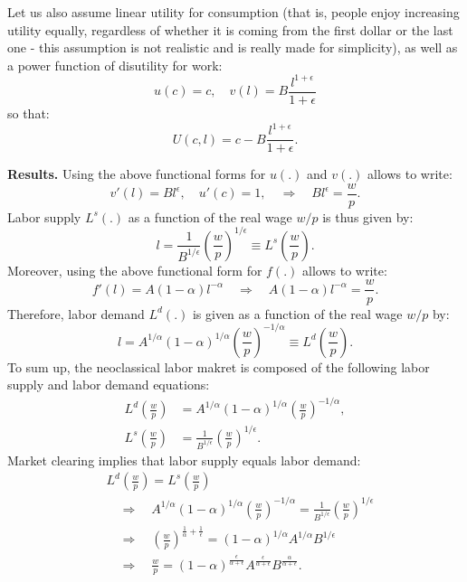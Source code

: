 \documentclass[]{book}
\theoremstyle{definition}
\theoremstyle{definition}
\theoremstyle{definition}
\theoremstyle{remark}
\begin{document}
Let us also assume linear utility for consumption (that is, people enjoy
increasing utility equally, regardless of whether it is coming from the
first dollar or the last one - this assumption is not realistic and is
really made for simplicity), as well as a power function of disutility
for work: \[u(c)=c, \quad v(l)=B\frac{l^{1+\epsilon}}{1+\epsilon}\] so
that: \[U(c, l)=c-B\frac{l^{1+\epsilon}}{1+\epsilon}.\]

\textbf{Results.} Using the above functional forms for \(u(.)\) and
\(v(.)\) allows to write:
\[v'(l)=Bl^{\epsilon}, \quad u'(c)=1, \quad \Rightarrow \quad Bl^{\epsilon} = \frac{w}{p}.\]
Labor supply \(L^{s}(.)\) as a function of the real wage \(w/p\) is thus
given by:
\[l =\frac{1}{B^{1/\epsilon}} \left(\frac{w}{p}\right)^{1/\epsilon} \equiv L^s\left(\frac{w}{p}\right).\]
Moreover, using the above functional form for \(f(.)\) allows to write:
\[f'(l) =A(1-\alpha)l^{-\alpha} \quad \Rightarrow \quad A(1-\alpha)l^{-\alpha}=\frac{w}{p}.\]
Therefore, labor demand \(L^d(.)\) is given as a function of the real
wage \(w/p\) by:
\[l=A^{1/\alpha}(1-\alpha)^{1/\alpha}\left(\frac{w}{p}\right)^{-1/\alpha}\equiv L^d\left(\frac{w}{p}\right).\]
To sum up, the neoclassical labor makret is composed of the following
labor supply and labor demand equations: \[
\begin{aligned}
L^d\left(\frac{w}{p}\right) &= A^{1/\alpha}(1-\alpha)^{1/\alpha}\left(\frac{w}{p}\right)^{-1/\alpha},\\
L^s\left(\frac{w}{p}\right) &= \frac{1}{B^{1/\epsilon}} \left(\frac{w}{p}\right)^{1/\epsilon}.
\end{aligned}
\] Market clearing implies that labor supply equals labor demand: \[
\begin{aligned}
&L^d\left(\frac{w}{p}\right) = L^s\left(\frac{w}{p}\right) \\
&\quad \Rightarrow \quad A^{1/\alpha}(1-\alpha)^{1/\alpha}\left(\frac{w}{p}\right)^{-1/\alpha} = \frac{1}{B^{1/\epsilon}} \left(\frac{w}{p}\right)^{1/\epsilon} \\
&\quad \Rightarrow \quad \left(\frac{w}{p}\right)^{\frac{1}{\alpha} +\frac{1}{\epsilon}}= (1-\alpha)^{1/\alpha}A^{1/\alpha} B^{1/\epsilon}\\
& \quad \Rightarrow \quad \frac{w}{p} = (1-\alpha)^{\frac{\epsilon}{\alpha+\epsilon}}A^{\frac{\epsilon}{\alpha+\epsilon}} B^{\frac{\alpha}{\alpha+\epsilon}}.
\end{aligned}
\]
\end{document}
